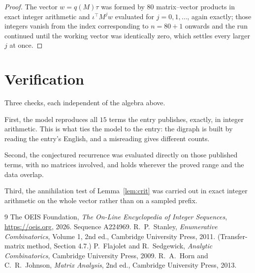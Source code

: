 \documentclass[11pt,a4paper]{article}
\theoremstyle{plain}
\theoremstyle{definition}
\begin{document}
\begin{proof}
The vector $w=q(M)\tau$ was formed by $80$ matrix--vector products in exact integer
arithmetic and $\iota^{\!\top}M^{j}w$ evaluated for $j=0,1,\dots$, again exactly; those
integers vanish from the index corresponding to $n=80+1$ onwards and the run continued
until the working vector was identically zero, which settles every larger $j$ at once.
\end{proof}

\section{Verification}

Three checks, each independent of the algebra above.

First, the model reproduces all $15$ terms the entry publishes, exactly, in integer
arithmetic. This is what ties the model to the entry: the digraph is built by reading the
entry's English, and a misreading gives different counts.

Second, the conjectured recurrence was evaluated directly on those published terms, with no
matrices involved, and holds wherever the proved range and the data overlap.

Third, the annihilation test of Lemma~\ref{lem:crit} was carried out in exact integer
arithmetic on the whole vector rather than on a sampled prefix.

\begin{thebibliography}{9}
 The OEIS Foundation, \emph{The On-Line Encyclopedia of Integer
Sequences}, \url{https://oeis.org}, 2026. Sequence A224969.
 R.~P.~Stanley, \emph{Enumerative Combinatorics}, Volume 1, 2nd ed.,
Cambridge University Press, 2011. (Transfer-matrix method, Section 4.7.)
 P.~Flajolet and R.~Sedgewick, \emph{Analytic Combinatorics}, Cambridge
University Press, 2009.
 R.~A.~Horn and C.~R.~Johnson, \emph{Matrix Analysis}, 2nd ed., Cambridge
University Press, 2013.
\end{thebibliography}
\end{document}
